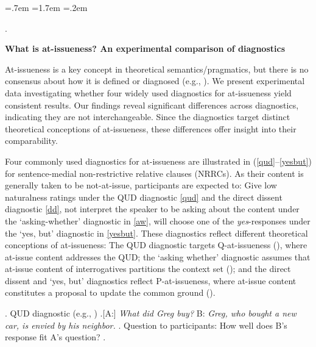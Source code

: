 \documentclass[11pt, a4paper]{article}
\newif\ifparens\parensfalse
\newcommand\pref[1]{{\parenstrue\ref{#1}}}
\begin{document}
  \Exlabelsep=.7em
  \SubExleftmargin=1.7em
  \Extopsep=.2em

\phantom.\vspace{-2.5\baselineskip}
\begin{center}
  {\large \bf What is at-issueness? An experimental comparison of diagnostics}  
\end{center}
\vspace{-.5\baselineskip}
\normalsize
  \noindent At-issueness is a key concept in theoretical semantics/pragmatics, but there is no consensus about how it is defined or diagnosed (e.g., \citealt{tonhauser2012diagnosing,tonhauser2018projective,koev2018notions}). We present experimental data investigating whether four widely used diagnostics for at-issueness yield consistent results. Our findings reveal significant differences across diagnostics, indicating they are not interchangeable. Since the diagnostics target distinct theoretical conceptions of at-issueness, these differences offer insight into their comparability.
  \vspace{.1\baselineskip}

  Four commonly used diagnostics for at\hyp issueness are illustrated in (\pref{qud}--\pref{yesbut}) for sentence-medial non-restrictive relative clauses (NRRCs). As their content is generally taken to be not-at-issue, participants are expected to:
  Give low naturalness ratings under the QUD diagnostic \ref{qud} and the direct dissent diagnostic \ref{dd}, not interpret the speaker to be asking about the content under the `asking-whether' diagnostic in \ref{aw}, will choose one of the %
  \emph{yes}-responses under the `yes, but' diagnostic in \ref{yesbut}.
  These diagnostics reflect different theoretical conceptions of at-issueness: The QUD diagnostic targets Q-at-issueness (\citealt{koev2018notions}), where at-issue content addresses the QUD; the `asking whether' diagnostic assumes that at-issue content of interrogatives partitions the context set (\citealt{tonhauser2018projective}); and the direct dissent and `yes, but' diagnostics reflect P-at-issueness, where at-issue content constitutes a proposal to update the common ground (\citealt{koev2018notions}).


  \ex. \label{qud}%
    QUD diagnostic (e.g., \citealt{tonhauser2012diagnosing,chen2024presuppositions})
    \a.[A:] \emph{What did Greg buy?} \hfill 
      B: \hspace{.5em} \emph{Greg, who bought a new car, is envied by his neighbor.}
    \z.
    Question to participants: How well does B's response fit A's question?
  \z.
\end{document}
